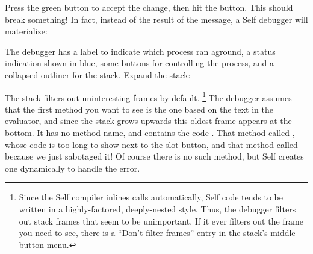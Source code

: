 \documentclass[letterpaper,10pt,english]{sphinxmanual}
\begin{document}
Press the green button to accept the change, then hit the  button. This should break something!
In fact, instead of the result of the message, a Self debugger will materialize:
\begin{figure}[htbp]\begin{flushleft}

\end{flushleft}\end{figure}

The debugger has a label to indicate which process ran aground, a status indication shown in blue,
some buttons for controlling the process, and a collapsed outliner for the stack. Expand the stack:
\begin{figure}[htbp]\begin{flushleft}

\end{flushleft}\end{figure}

The stack filters out uninteresting frames by default. \footnote{
Since the Self compiler inlines calls automatically, Self code tends to be written in a highly-factored, deeply-nested style. Thus, the debugger filters out stack frames that seem to be unimportant. If it ever filters out the frame you need to see, there is a “Don’t filter frames” entry in the stack’s middle-button menu.
} The debugger assumes that the first method
you want to see is the one based on the text in the evaluator, and since the stack grows upwards this
oldest frame appears at the bottom. It has no method name, and contains the code . That
method called , whose code is too long to show next to the slot button, and that method
called  because we just sabotaged it! Of course there is no such method,
but Self creates one dynamically to handle the error.
\end{document}
